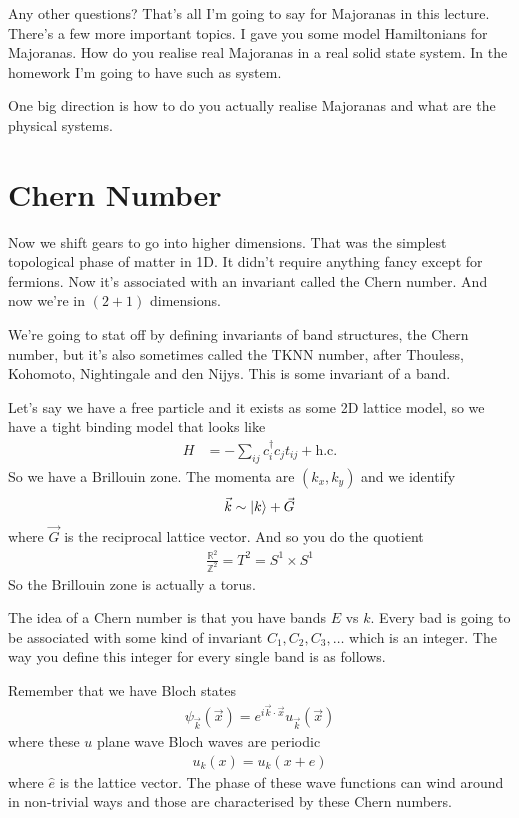 Any other questions?
That's all I'm going to say for Majoranas in this lecture.
There's a few more important topics.
I gave you some model Hamiltonians for Majoranas.
How do you realise real Majoranas in a real solid state system.
In the homework I'm going to have such as system.

One big direction is how to do you actually realise Majoranas and what are the
physical systems.

\section{Chern Number}
Now we shift gears to go into higher dimensions.
That was the simplest topological phase of matter in 1D.
It didn't require anything fancy except for fermions.
Now it's associated with an invariant called the Chern number.
And now we're in $(2+1)$ dimensions.

We're going to stat off by defining invariants of band structures,
the Chern number,
but it's also sometimes called the TKNN number,
after Thouless, Kohomoto, Nightingale and den Nijys.
This is some invariant of a band.

Let's say we have a free particle
and it exists as some 2D lattice model,
so we have a tight binding model that looks like
\begin{align}
    H &=
    - \sum_{ij} c_i^\dagger c_j t_{ij} + \text{h.c.}
\end{align}
So we have a Brillouin zone.
The momenta are $(k_x, k_y)$ and we identify
\begin{align}
    \vec{k} \sim \ket{k} + \vec{G}
\end{align}
where $\vec{G}$ is the reciprocal lattice vector.
And so you do the quotient
\begin{align}
    \frac{\mathbb{R}^2}{\mathbb{Z}^2} = T^2 = S^1\times S^1
\end{align}
So the Brillouin zone is actually a torus.

The idea of a Chern number is that you have bands
$E$ vs $k$.
Every bad is going to be associated with some kind of invariant 
$C_1,C_2,C_3,\ldots$ which is an integer.
The way you define this integer for every single band is as follows.

Remember that we have Bloch states
\begin{align}
    \psi_{\vec{k}}(\vec{x})
    = e^{i\vec{k}\cdot\vec{x}}
    u_{\vec{k}}(\vec{x})
\end{align}
where these $u$ plane wave Bloch waves are periodic
\begin{align}
    u_k (x) = u_k(x + e)
\end{align}
where $\hat{e}$ is the lattice vector.
The phase of these wave functions can wind around in non-trivial ways and those
are characterised by these Chern numbers.

